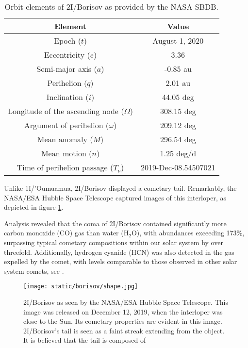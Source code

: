\begin{table}[H]
  \centering
  \begin{tabular}{|c|c|}
    \hline
    Element                                    & Value                \\
    \hline
    Epoch ($t$)                                & August 1, 2020       \\
    Eccentricity ($e$)                         & 3.36                 \\
    Semi-major axis ($a$)                      & -0.85 au             \\
    Perihelion ($q$)                           & 2.01 au              \\
    Inclination ($i$)                          & 44.05 deg            \\
    Longitude of the ascending node ($\Omega$) & 308.15 deg           \\
    Argument of perihelion ($\omega$)          & 209.12 deg           \\
    Mean anomaly ($M$)                         & 296.54 deg           \\
    Mean motion ($n$)                          & 1.25 deg/d           \\
    Time of perihelion passage ($T_p$)         & 2019-Dec-08.54507021 \\
    \hline
  \end{tabular}
  \caption{Orbit elements of 2I/Borisov as provided by the NASA SBDB.}
  \label{tab:borisov_elements}
\end{table}

Unlike 1I/'Oumuamua, 2I/Borisov displayed a cometary tail. Remarkably, the NASA/ESA
Hubble Space Telescope captured images of this interloper, as depicted in figure
\ref{fig:borisov_shape}.

Analysis revealed that the coma of 2I/Borisov contained significantly more
carbon monoxide (CO) gas than water (H$_2$O), with abundances exceeding 173\%,
surpassing typical cometary compositions within our solar system by over
threefold. Additionally, hydrogen cyanide (HCN) was also detected in the gas
expelled by the comet, with levels comparable to those observed in other solar
system comets, see \cite{bodewits2020}.

\begin{figure}[H]
  \centering
  \texttt{[image: static/borisov/shape.jpg]}
  \caption[Borisov as seen by the NASA/ESA Hubble Space Telescope]{
    2I/Borisov as seen by the NASA/ESA Hubble Space Telescope. This image was
    released on December 12, 2019, when the interloper was close to the Sun. Its
    cometary properties are evident in this image. 2I/Borisov's tail is seen as a
    faint streak extending from the object. It is believed that the tail is composed
    of
  }
  \label{fig:borisov_shape}
\end{figure}

